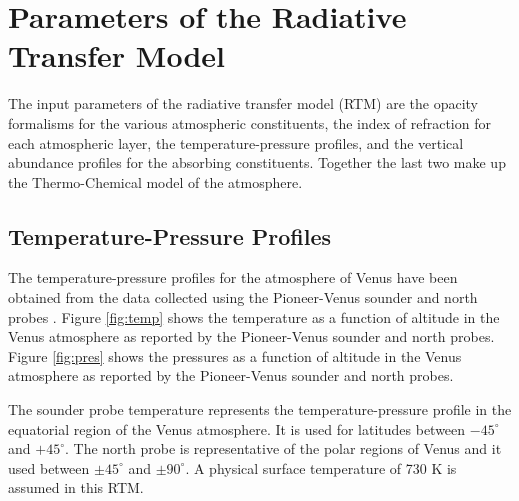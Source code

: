 \section{Parameters of the Radiative Transfer Model}
The input parameters of the radiative transfer model (RTM) are the opacity formalisms for the various atmospheric constituents, the index of refraction for each atmospheric layer, the temperature-pressure profiles, and the vertical abundance profiles for the absorbing constituents. Together the last two make up the Thermo-Chemical model of the atmosphere.
\subsection{Temperature-Pressure Profiles}
The temperature-pressure profiles for the atmosphere of Venus have been obtained from the data collected using the Pioneer-Venus sounder and north probes \cite{Seiff-1980}. Figure \ref{fig:temp} shows the temperature as a function of altitude in the Venus atmosphere as reported by the Pioneer-Venus sounder and north probes. Figure \ref{fig:pres} shows the pressures as a function of altitude in the Venus atmosphere as reported by the Pioneer-Venus sounder and north probes.

The sounder probe temperature represents the temperature-pressure profile in the equatorial region of the Venus atmosphere. It is used for latitudes between $-45^\circ$ and $+45^\circ$. The north probe is representative of the polar regions of Venus and it used between $\pm 45^\circ$ and $\pm90^\circ$. A physical surface temperature of 730 K is assumed in this RTM.

